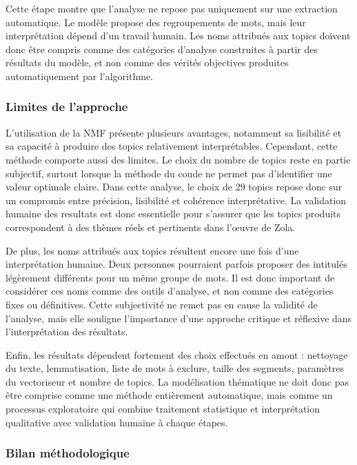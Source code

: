 \documentclass{article}
\begin{document}
Cette étape montre que l’analyse ne repose pas uniquement sur une extraction automatique. Le modèle propose des regroupements de mots, mais leur interprétation dépend d’un travail humain. Les noms attribués aux topics doivent donc être compris comme des catégories d’analyse construites à partir des résultats du modèle, et non comme des vérités objectives produites automatiquement par l’algorithme.


\subsubsection{Limites de l’approche}

L’utilisation de la NMF présente plusieurs avantages, notamment sa lisibilité et sa capacité à produire des topics relativement interprétables. Cependant, cette méthode comporte aussi des limites. Le choix du nombre de topics reste en partie subjectif, surtout lorsque la méthode du coude ne permet pas d’identifier une valeur optimale claire. Dans cette analyse, le choix de 29 topics repose donc sur un compromis entre précision, lisibilité et cohérence interprétative. La validation humaine des resultats est donc essentielle pour s'assurer que les topics produits correspondent à des thèmes réels et pertinents dans l'œuvre de Zola.

De plus, les noms attribués aux topics résultent encore une fois d’une interprétation humaine. Deux personnes pourraient parfois proposer des intitulés légèrement différents pour un même groupe de mots. Il est donc important de considérer ces noms comme des outils d’analyse, et non comme des catégories fixes ou définitives. Cette subjectivité ne remet pas en cause la validité de l’analyse, mais elle souligne l’importance d’une approche critique et réflexive dans l’interprétation des résultats.

Enfin, les résultats dépendent fortement des choix effectués en amont : nettoyage du texte, lemmatisation, liste de mots à exclure, taille des segments, paramètres du vectoriseur et nombre de topics. La modélisation thématique ne doit donc pas être comprise comme une méthode entièrement automatique, mais comme un processus exploratoire qui combine traitement statistique et interprétation qualitative avec validation humaine à chaque étapes.

\subsubsection{Bilan méthodologique}
\end{document}
